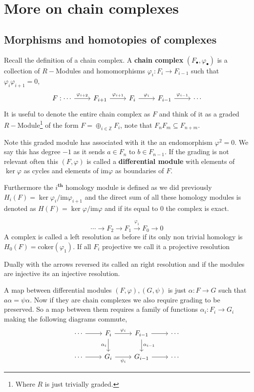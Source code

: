 \documentclass[12pt]{article}
\numberwithin{equation}{section}
\newcommand{\Z}{\mathbb{Z}}
\begin{document}
	\section{More on chain complexes}
	\subsection{Morphisms and homotopies of complexes}
	Recall the definition of a chain complex.
	A \textbf{chain complex} $(F_\bullet, \varphi_\bullet)$ is a collection of $R-$Modules and homomorphisms $\varphi_i: F_i \to F_{i-1}$ such that $\varphi_i \varphi_{i+1}=0$,
	\[\begin{tikzcd}
		F:\cdots & {F_{i+1}} & {F_i} & {F_{i-1}} & \cdots
		\arrow["{\varphi_{i+1}}", from=1-2, to=1-3]
		\arrow["{\varphi_i}", from=1-3, to=1-4]
		\arrow["{\varphi_{i-1}}", from=1-4, to=1-5]
		\arrow["{\varphi_{i+2}}", from=1-1, to=1-2]
	\end{tikzcd}\]
	It is useful to denote the entire chain complex as $F$ and think of it as a graded $R-$Module\footnote{Where $R$ is just trivially graded.} of the form $F=\oplus_{i \in \Z} F_i$, note that $F_n F_m \subseteq F_{n+m}$. 
	
	Note this graded module has associated with it the an endomorphism $\varphi^2=0$. We say this has degree $-1$ as it sends $a \in F_n$ to $b \in F_{n-1}$. If the grading is not relevant often this $(F,\varphi )$ is called a \textbf{differential module} with elements of $\ker \varphi $ as cycles and elements of $\mathrm{im} \varphi $ as boundaries of $F$.
	
	Furthermore the $i^{\textbf{th}}$ homology module is defined as we did previously $H_i(F)=\ker \varphi_i/ \mathrm{im} \varphi_{i+1}$ and the direct sum of all these homology modules is denoted as $H(F)=\ker \varphi/ \mathrm{im} \varphi $ and if its equal to 0 the complex is exact.
	
	
	\[ 	\cdots \to F_2	\to F_1 \xrightarrow{\varphi_1} F_0 \to 0 \]
		A complex is called a left resolution as before if its only non trivial homology is $H_0(F)=\mathrm{coker}(\varphi_1)$. If all $F_i$ projective we call it a projective resolution
		
	Dually with the arrows reversed its called an right resolution and if the modules are injective its an injective resolution.
	
	A map between differential modules $(F, \varphi), (G, \psi)$ is just $\alpha: F \to G$ such that $a \alpha = \psi \alpha $. Now if they are chain complexes we also require grading to be preserved.
	So a map between them requires a family of functions $\alpha_i: F_i \to G_i$ making the following diagrams commute,
	\[\begin{tikzcd}
		\cdots & {F_i} & {F_{i-1}} & \cdots \\
		\cdots & {G_i} & {G_{i-1}} & \cdots
		\arrow["{\varphi_i}", from=1-2, to=1-3]
		\arrow["{\alpha_i}"', from=1-2, to=2-2]
		\arrow["{\alpha_{i-1}}", from=1-3, to=2-3]
		\arrow["{\psi_i}"', from=2-2, to=2-3]
		\arrow[from=1-1, to=1-2]
		\arrow[from=2-1, to=2-2]
		\arrow[from=2-3, to=2-4]
		\arrow[from=1-3, to=1-4]
	\end{tikzcd}\]
	
\end{document}
